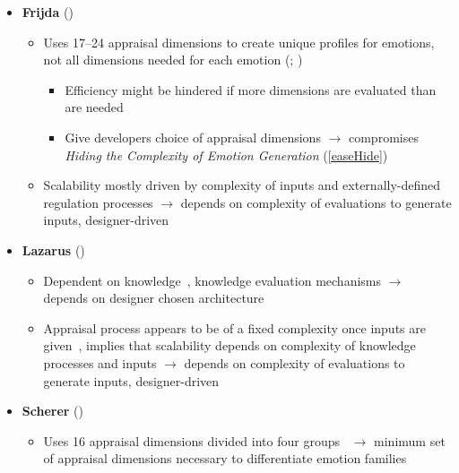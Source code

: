 \begin{itemize}
    \item \textbf{Frijda} (\good)
    \begin{itemize}
        \item Uses 17--24 appraisal dimensions to create unique profiles for
        emotions, not all dimensions needed for each emotion
        (;
        )
        \begin{itemize}
            \item Efficiency might be hindered if more dimensions are evaluated
            than are needed

            \item Give developers choice of appraisal dimensions $\rightarrow$
            compromises \textit{Hiding the Complexity of Emotion Generation}
            (\ref{easeHide})
        \end{itemize}

        \item Scalability mostly driven by complexity of inputs and
        externally-defined regulation processes $\rightarrow$ depends on
        complexity of evaluations to generate inputs, designer-driven
    \end{itemize}

    \item \textbf{Lazarus} (\strong)
    \begin{itemize}
        \item Dependent on knowledge~\citep[p.~145]{lazarus1991emotion},
        knowledge evaluation mechanisms $\rightarrow$ depends on designer chosen
        architecture

        \item Appraisal process appears to be of a fixed complexity once inputs
        are given~\citep[p.~210]{lazarus1991emotion}, implies that scalability
        depends on complexity of knowledge processes and inputs $\rightarrow$
        depends on complexity of evaluations to generate inputs, designer-driven
    \end{itemize}

    \item \textbf{Scherer} (\good)
    \begin{itemize}
        \item Uses 16 appraisal dimensions divided into four
        groups~\citep[p.~114--115]{scherer2001appraisalB} $\rightarrow$ minimum
        set of appraisal dimensions necessary to differentiate emotion
        families~\citep[p.~94]{scherer2001appraisalB}


\end{itemize}
\end{itemize}
